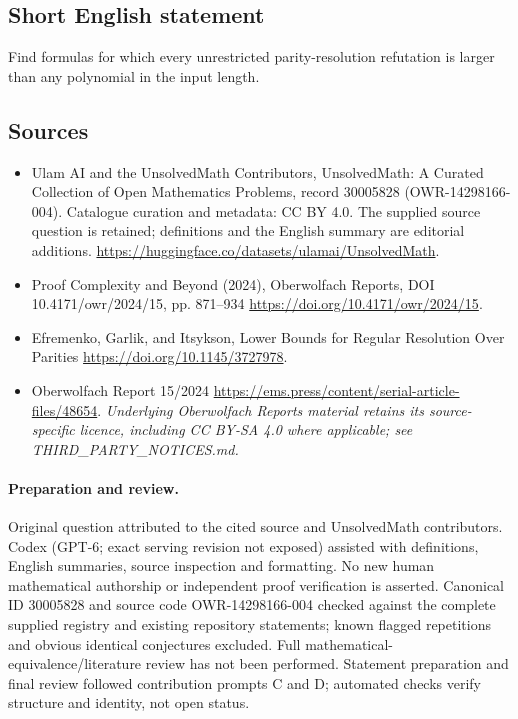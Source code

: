 \documentclass[11pt]{article}
\begin{document}
\subsection{Short English statement}
Find formulas for which every unrestricted parity-resolution refutation is larger than any polynomial in the input length.
\subsection{Sources}
\begin{itemize}
\item[\hypertarget{source:30005828:1}{S1}] Ulam AI and the UnsolvedMath Contributors, UnsolvedMath: A Curated Collection of Open Mathematics Problems, record 30005828 (OWR-14298166-004). Catalogue curation and metadata: CC BY 4.0. The supplied source question is retained; definitions and the English summary are editorial additions.
\url{https://huggingface.co/datasets/ulamai/UnsolvedMath}.
\item[\hypertarget{source:30005828:2}{S2}] Proof Complexity and Beyond (2024), Oberwolfach Reports, DOI 10.4171/owr/2024/15, pp. 871--934
\url{https://doi.org/10.4171/owr/2024/15}.
\item[\hypertarget{source:30005828:3}{S3}] Efremenko, Garlik, and Itsykson, Lower Bounds for Regular Resolution Over Parities
\url{https://doi.org/10.1145/3727978}.
\item[\hypertarget{source:30005828:4}{S4}] Oberwolfach Report 15/2024
\url{https://ems.press/content/serial-article-files/48654}.
\textit{Underlying Oberwolfach Reports material retains its source-specific licence, including CC BY-SA 4.0 where applicable; see THIRD\_PARTY\_NOTICES.md.}
\end{itemize}
\paragraph{Preparation and review.}
Original question attributed to the cited source and UnsolvedMath contributors. Codex (GPT-6; exact serving revision not exposed) assisted with definitions, English summaries, source inspection and formatting. No new human mathematical authorship or independent proof verification is asserted. Canonical ID 30005828 and source code OWR-14298166-004 checked against the complete supplied registry and existing repository statements; known flagged repetitions and obvious identical conjectures excluded. Full mathematical-equivalence/literature review has not been performed. Statement preparation and final review followed contribution prompts C and D; automated checks verify structure and identity, not open status.
\label{end:30005828}
\end{document}
